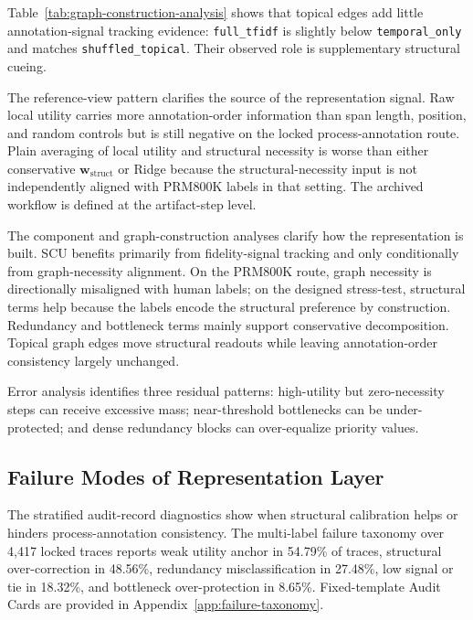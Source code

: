 \documentclass[a4paper,fleqn]{cas-sc}
\newcommand{\wstruct}{\ensuremath{\mathbf{w}_{\mathrm{struct}}}}
\begin{document}
Table~\ref{tab:graph-construction-analysis} shows that topical edges add little annotation-signal tracking evidence: \texttt{full\_tfidf} is slightly below \texttt{temporal\_only} and matches \texttt{shuffled\_topical}. Their observed role is supplementary structural cueing.

The reference-view pattern clarifies the source of the representation signal. Raw local utility carries more annotation-order information than span length, position, and random controls but is still negative on the locked process-annotation route. Plain averaging of local utility and structural necessity is worse than either conservative \wstruct{} or Ridge because the structural-necessity input is not independently aligned with PRM800K labels in that setting. The archived workflow is defined at the artifact-step level.

The component and graph-construction analyses clarify how the representation is built. SCU benefits primarily from fidelity-signal tracking and only conditionally from graph-necessity alignment. On the PRM800K route, graph necessity is directionally misaligned with human labels; on the designed stress-test, structural terms help because the labels encode the structural preference by construction. Redundancy and bottleneck terms mainly support conservative decomposition. Topical graph edges move structural readouts while leaving annotation-order consistency largely unchanged.

Error analysis identifies three residual patterns: high-utility but zero-necessity steps can receive excessive mass; near-threshold bottlenecks can be under-protected; and dense redundancy blocks can over-equalize priority values.

\subsection{Failure Modes of Representation Layer}
\label{sec:prm800k-error}

The stratified audit-record diagnostics show when structural calibration helps or hinders process-annotation consistency. The multi-label failure taxonomy over 4,417 locked traces reports weak utility anchor in 54.79\% of traces, structural over-correction in 48.56\%, redundancy misclassification in 27.48\%, low signal or tie in 18.32\%, and bottleneck over-protection in 8.65\%. Fixed-template Audit Cards are provided in Appendix~\ref{app:failure-taxonomy}.
\end{document}
